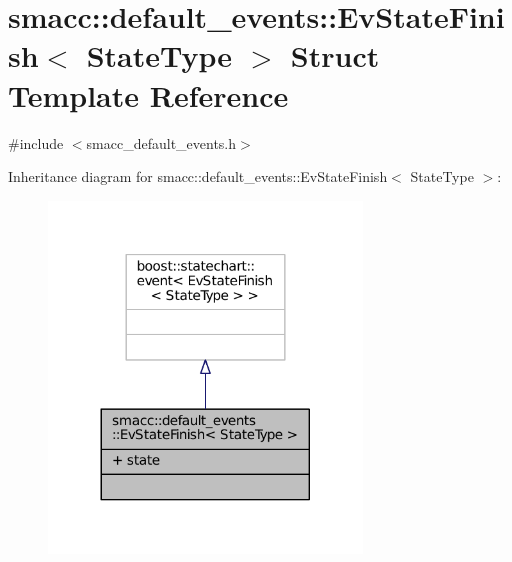 \hypertarget{structsmacc_1_1default__events_1_1EvStateFinish}{}\section{smacc\+:\+:default\+\_\+events\+:\+:Ev\+State\+Finish$<$ State\+Type $>$ Struct Template Reference}
\label{structsmacc_1_1default__events_1_1EvStateFinish}


{\ttfamily \#include $<$smacc\+\_\+default\+\_\+events.\+h$>$}



Inheritance diagram for smacc\+:\+:default\+\_\+events\+:\+:Ev\+State\+Finish$<$ State\+Type $>$\+:
\nopagebreak
\begin{figure}[H]
\begin{center}
\leavevmode
\includegraphics[width=236pt]{structsmacc_1_1default__events_1_1EvStateFinish__inherit__graph}
\end{center}
\end{figure}


